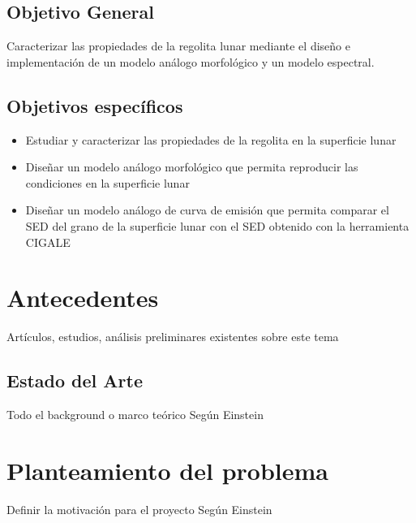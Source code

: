 \documentclass[12pt]{article}
\begin{document}
\subsection{Objetivo General}
Caracterizar las propiedades de la regolita lunar mediante el diseño e  implementación de un modelo análogo morfológico y un modelo espectral.

\subsection{Objetivos específicos}
\begin{itemize}
    \item Estudiar y caracterizar las propiedades de la regolita  en la superficie lunar
    \item Diseñar un modelo análogo morfológico que permita reproducir las condiciones en la superficie lunar %
    \item Diseñar un modelo análogo de curva de emisión que permita comparar el SED del grano de la superficie lunar con el SED obtenido con la herramienta CIGALE
\end{itemize}

\section{Antecedentes}
Artículos, estudios, análisis preliminares existentes sobre este tema
\subsection{Estado del Arte}
Todo el background o marco teórico Según Einstein
\section{Planteamiento del problema}
Definir la motivación para el proyecto Según Einstein
\end{document}
